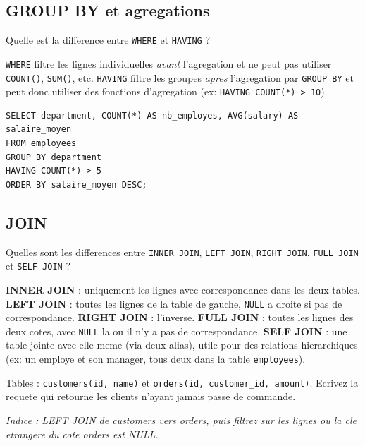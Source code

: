 \documentclass[11pt,a4paper]{article}
\begin{document}
\subsection{GROUP BY et agregations}

\begin{question} Quelle est la difference entre \texttt{WHERE} et \texttt{HAVING} ?
\end{question}
\begin{reponse}
\texttt{WHERE} filtre les lignes individuelles \emph{avant} l'agregation et ne peut pas utiliser \texttt{COUNT()}, \texttt{SUM()}, etc. \texttt{HAVING} filtre les groupes \emph{apres} l'agregation par \texttt{GROUP BY} et peut donc utiliser des fonctions d'agregation (ex: \texttt{HAVING COUNT(*) > 10}).
\end{reponse}

\begin{lstlisting}[style=sqlstyle]
SELECT department, COUNT(*) AS nb_employes, AVG(salary) AS salaire_moyen
FROM employees
GROUP BY department
HAVING COUNT(*) > 5
ORDER BY salaire_moyen DESC;
\end{lstlisting}

\subsection{JOIN}

\begin{question} Quelles sont les differences entre \texttt{INNER JOIN}, \texttt{LEFT JOIN}, \texttt{RIGHT JOIN}, \texttt{FULL JOIN} et \texttt{SELF JOIN} ?
\end{question}
\begin{reponse}
\textbf{INNER JOIN} : uniquement les lignes avec correspondance dans les deux tables. \textbf{LEFT JOIN} : toutes les lignes de la table de gauche, \texttt{NULL} a droite si pas de correspondance. \textbf{RIGHT JOIN} : l'inverse. \textbf{FULL JOIN} : toutes les lignes des deux cotes, avec \texttt{NULL} la ou il n'y a pas de correspondance. \textbf{SELF JOIN} : une table jointe avec elle-meme (via deux alias), utile pour des relations hierarchiques (ex: un employe et son manager, tous deux dans la table \texttt{employees}).
\end{reponse}

\begin{coding}
Tables : \texttt{customers(id, name)} et \texttt{orders(id, customer\_id, amount)}. Ecrivez la requete qui retourne les clients n'ayant jamais passe de commande.

\emph{Indice : LEFT JOIN de customers vers orders, puis filtrez sur les lignes ou la cle etrangere du cote orders est NULL.}
\end{coding}
\end{document}
